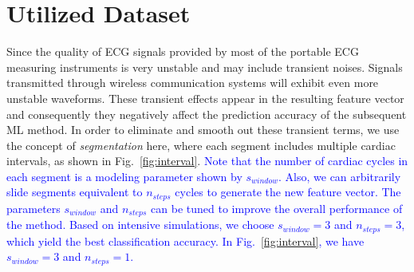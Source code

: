 \section{Utilized Dataset}

Since the quality of ECG signals provided by most of the portable ECG measuring instruments is very unstable and may include transient noises. Signals transmitted through wireless communication systems will exhibit even more unstable waveforms. These transient effects appear in the resulting feature vector and consequently they negatively affect the prediction accuracy of the subsequent ML method. In order to eliminate and smooth out these transient terms, we use the concept of \textit{segmentation} here, where each segment includes multiple cardiac intervals, 
as shown in Fig.~\ref{fig:interval}. \textcolor{blue}{Note that the number of cardiac cycles in each segment is a modeling parameter shown by $s_{window}$. Also, we can arbitrarily slide segments equivalent to $n_{steps}$ cycles to generate the new feature vector. The parameters $s_{window}$ and $n_{steps}$ can be tuned to improve the overall performance of the method.  Based on intensive simulations, we choose $s_{window}=3$ and $n_{steps}=3$, which yield the best classification accuracy. In Fig.~\ref{fig:interval}, we have $s_{window}=3$ and $n_{steps}=1$.}

